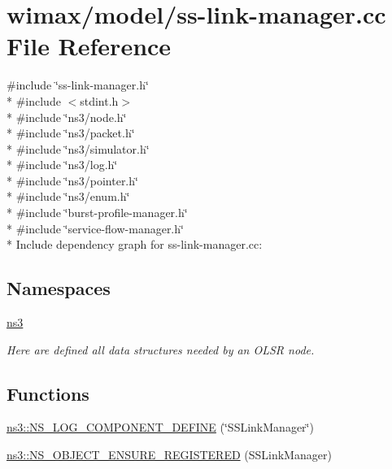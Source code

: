 \hypertarget{ss-link-manager_8cc}{}\section{wimax/model/ss-\/link-\/manager.cc File Reference}
\label{ss-link-manager_8cc}
{\ttfamily \#include \char`\"{}ss-\/link-\/manager.\+h\char`\"{}}\\*
{\ttfamily \#include $<$stdint.\+h$>$}\\*
{\ttfamily \#include \char`\"{}ns3/node.\+h\char`\"{}}\\*
{\ttfamily \#include \char`\"{}ns3/packet.\+h\char`\"{}}\\*
{\ttfamily \#include \char`\"{}ns3/simulator.\+h\char`\"{}}\\*
{\ttfamily \#include \char`\"{}ns3/log.\+h\char`\"{}}\\*
{\ttfamily \#include \char`\"{}ns3/pointer.\+h\char`\"{}}\\*
{\ttfamily \#include \char`\"{}ns3/enum.\+h\char`\"{}}\\*
{\ttfamily \#include \char`\"{}burst-\/profile-\/manager.\+h\char`\"{}}\\*
{\ttfamily \#include \char`\"{}service-\/flow-\/manager.\+h\char`\"{}}\\*
Include dependency graph for ss-\/link-\/manager.cc\+:
\subsection*{Namespaces}
\begin{DoxyCompactItemize}
\item 
 \hyperlink{namespacens3}{ns3}
\begin{DoxyCompactList}\small\item\em Here are defined all data structures needed by an O\+L\+SR node. \end{DoxyCompactList}\end{DoxyCompactItemize}
\subsection*{Functions}
\begin{DoxyCompactItemize}
\item 
\hyperlink{namespacens3_ae740c2b0aae9c0a1c0ddf9b9aa620db4}{ns3\+::\+N\+S\+\_\+\+L\+O\+G\+\_\+\+C\+O\+M\+P\+O\+N\+E\+N\+T\+\_\+\+D\+E\+F\+I\+NE} (\char`\"{}S\+S\+Link\+Manager\char`\"{})
\item 
\hyperlink{namespacens3_aacd6a9c85192dc5509b770de5460fe76}{ns3\+::\+N\+S\+\_\+\+O\+B\+J\+E\+C\+T\+\_\+\+E\+N\+S\+U\+R\+E\+\_\+\+R\+E\+G\+I\+S\+T\+E\+R\+ED} (S\+S\+Link\+Manager)
\end{DoxyCompactItemize}
